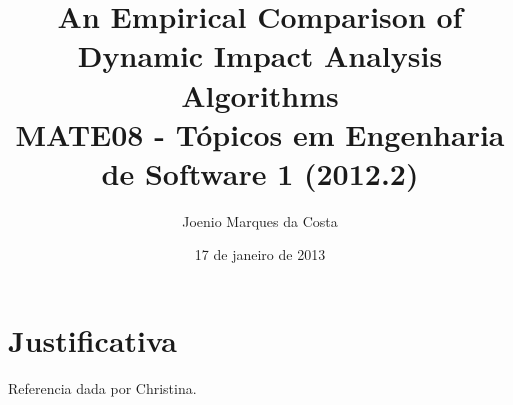 \documentclass[12pt]{article}
\title{An Empirical Comparison of Dynamic Impact Analysis Algorithms
 \cite{DynamicImpactAnalysis} \\
 \large MATE08 - Tópicos em Engenharia de Software 1 (2012.2)}
\author{Joenio Marques da Costa}
\date{17 de janeiro de 2013}
\begin{document}
\maketitle

\section{Justificativa}

Referencia \cite{XFlow} dada por Christina.


\end{document}
